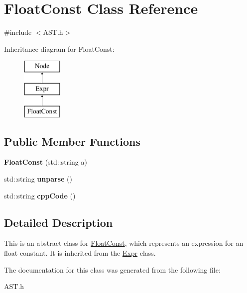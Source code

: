 \hypertarget{class_float_const}{}\section{Float\+Const Class Reference}
\label{class_float_const}


{\ttfamily \#include $<$A\+S\+T.\+h$>$}

Inheritance diagram for Float\+Const\+:\begin{figure}[H]
\begin{center}
\leavevmode
\includegraphics[height=3.000000cm]{class_float_const}
\end{center}
\end{figure}
\subsection*{Public Member Functions}
\begin{DoxyCompactItemize}
\item 
\hypertarget{class_float_const_a6d2f90e9b24188c7d1f836dc6bf5dee1}{}{\bfseries Float\+Const} (std\+::string a)\label{class_float_const_a6d2f90e9b24188c7d1f836dc6bf5dee1}

\item 
\hypertarget{class_float_const_a73200c85ef60abc0e9a8580fb6427257}{}std\+::string {\bfseries unparse} ()\label{class_float_const_a73200c85ef60abc0e9a8580fb6427257}

\item 
\hypertarget{class_float_const_adb3b361377914fe2c9dce671169b8b05}{}std\+::string {\bfseries cpp\+Code} ()\label{class_float_const_adb3b361377914fe2c9dce671169b8b05}

\end{DoxyCompactItemize}


\subsection{Detailed Description}
This is an abstract class for \hyperlink{class_float_const}{Float\+Const}, which represents an expression for an float constant. It is inherited from the \hyperlink{class_expr}{Expr} class. 

The documentation for this class was generated from the following file\+:\begin{DoxyCompactItemize}
\item 
A\+S\+T.\+h\end{DoxyCompactItemize}

